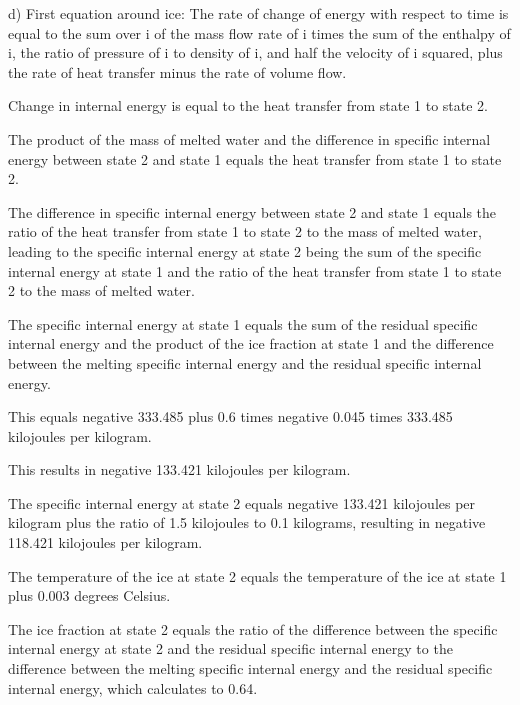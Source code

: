 d) First equation around ice:
The rate of change of energy with respect to time is equal to the sum over i of the mass flow rate of i times the sum of the enthalpy of i, the ratio of pressure of i to density of i, and half the velocity of i squared, plus the rate of heat transfer minus the rate of volume flow.

Change in internal energy is equal to the heat transfer from state 1 to state 2.

The product of the mass of melted water and the difference in specific internal energy between state 2 and state 1 equals the heat transfer from state 1 to state 2.

The difference in specific internal energy between state 2 and state 1 equals the ratio of the heat transfer from state 1 to state 2 to the mass of melted water, leading to the specific internal energy at state 2 being the sum of the specific internal energy at state 1 and the ratio of the heat transfer from state 1 to state 2 to the mass of melted water.

The specific internal energy at state 1 equals the sum of the residual specific internal energy and the product of the ice fraction at state 1 and the difference between the melting specific internal energy and the residual specific internal energy.

This equals negative 333.485 plus 0.6 times negative 0.045 times 333.485 kilojoules per kilogram.

This results in negative 133.421 kilojoules per kilogram.

The specific internal energy at state 2 equals negative 133.421 kilojoules per kilogram plus the ratio of 1.5 kilojoules to 0.1 kilograms, resulting in negative 118.421 kilojoules per kilogram.

The temperature of the ice at state 2 equals the temperature of the ice at state 1 plus 0.003 degrees Celsius.

The ice fraction at state 2 equals the ratio of the difference between the specific internal energy at state 2 and the residual specific internal energy to the difference between the melting specific internal energy and the residual specific internal energy, which calculates to 0.64.